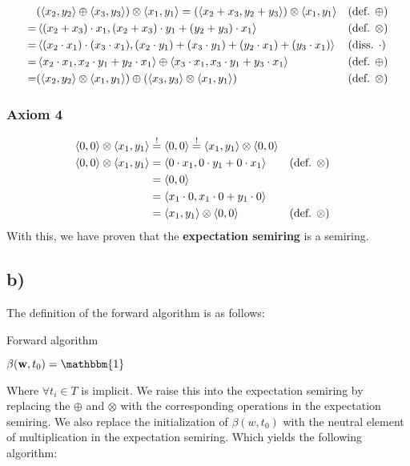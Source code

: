 \documentclass[a4paper,12pt]{ETHexercise}
\begin{document}
\begin{align}
    &(\left\langle x_2, y_2\right\rangle \oplus \left\langle x_3, y_3\right\rangle) \otimes \left\langle x_1, y_1\right\rangle = (\left\langle x_2 + x_3, y_2 + y_3\right\rangle) \otimes \left\langle x_1, y_1\right\rangle &&(\text{def. }\oplus)\\
    = &\left\langle(x_2 + x_3) \cdot x_1, (x_2 + x_3) \cdot y_1 + (y_2 + y_3) \cdot x_1\right\rangle &&(\text{def. }\otimes)\\
    = &\left\langle(x_2 \cdot x_1) \cdot (x_3 \cdot x_1), (x_2 \cdot y_1) + (x_3 \cdot y_1) + (y_2 \cdot x_1)+ (y_3 \cdot x_1)\right\rangle &&(\text{diss. }\cdot)\\
    = &\left\langle x_2 \cdot x_1, x_2 \cdot y_1 + y_2 \cdot x_1\right\rangle \oplus \left\langle x_3 \cdot x_1, x_3 \cdot y_1 + y_3 \cdot x_1\right\rangle &&(\text{def. }\oplus)\\
    = &(\left\langle x_2, y_2\right\rangle \otimes \left\langle x_1, y_1\right\rangle) \oplus (\left\langle x_3, y_3\right\rangle \otimes \left\langle x_1, y_1\right\rangle) &&(\text{def. }\otimes)
\end{align}

\subsubsection*{Axiom 4}
\begin{align}
    \left\langle0, 0\right\rangle \otimes \left\langle x_1, y_1\right\rangle &\stackrel{!}{=} \left\langle0, 0\right\rangle \stackrel{!}{=} \left\langle x_1, y_1\right\rangle \otimes \left\langle0, 0\right\rangle\\
    \left\langle0, 0\right\rangle \otimes \left\langle x_1, y_1\right\rangle &= \left\langle0 \cdot x_1, 0 \cdot y_1 + 0 \cdot x_1\right\rangle &&(\text{def. }\otimes)\\
    &= \left\langle0, 0\right\rangle\\
    &= \left\langle x_1 \cdot 0, x_1 \cdot 0 + y_1 \cdot 0\right\rangle \\
    &= \left\langle x_1, y_1\right\rangle \otimes \left\langle0, 0\right\rangle &&(\text{def. }\otimes)
\end{align}
With this, we have proven that the \textbf{expectation semiring} is a semiring.

\subsection*{b)}
The definition of the forward algorithm is as follows:
\begin{algorithm}
    \SetAlgoLined
    \caption{Forward algorithm}
    \label{alg:forward}
    $\beta(\textbf{w}, t_0) = \mathbbm{1}$\\
\end{algorithm}
Where $\forall t_i \in T$ is implicit. 
We raise this into the expectation semiring by replacing the $\oplus$ and $\otimes$ with the corresponding operations in the expectation semiring. We also replace the initialization of $\beta(w, t_0)$ with the neutral element of multiplication in the expectation semiring. Which yields the following algorithm:
\end{document}
